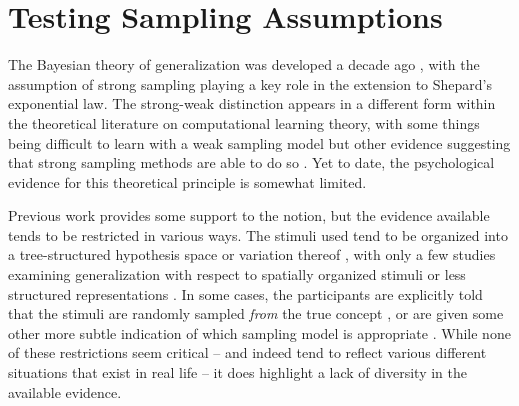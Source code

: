 \documentclass[doc]{apa6}
\begin{document}
\section{Testing Sampling Assumptions}

The Bayesian theory of generalization was developed a decade ago \cite{Tenenbaum1999,Tenenbaum2001}, with the assumption of strong sampling playing a key role in the extension to Shepard's \citeyear{Shepard1987} exponential law. The strong-weak distinction appears in a different form within the theoretical literature on computational learning theory, with some things being difficult to learn with a weak sampling model \cite{Gold1967} but other evidence suggesting that strong sampling methods are able to do so \cite{Muggleton1997}. Yet to date, the psychological evidence for this theoretical principle is somewhat limited.

Previous work \cite{Tenenbaum1999,Sanjana2003,Navarroinpress,Xu2007,Xu2007b} provides some support to the notion, but the evidence available tends to be restricted in various ways. The stimuli used tend to be organized into a tree-structured hypothesis space  or variation thereof \cite{Sanjana2003}, with only a few studies examining generalization with respect to spatially organized stimuli \cite{Tenenbaum1999} or less structured representations \cite{Navarroinpress}. In some cases, the participants are explicitly told that the stimuli are randomly sampled {\it from} the true concept \cite{Tenenbaum1999}, or are given some other more subtle indication of which sampling model is appropriate \cite{Xu2007b}. While none of these restrictions seem critical -- and indeed tend to reflect various different situations that exist in real life -- it does highlight a lack of diversity in the available evidence.
\end{document}
